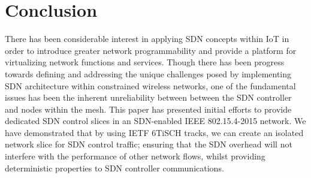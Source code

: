 \section{Conclusion}
\label{sec_conclusion}

There has been considerable interest in applying SDN concepts within IoT in order to introduce greater network programmability and provide a platform for virtualizing network functions and services. Though there has been progress towards defining and addressing the unique challenges posed by implementing SDN architecture within constrained wireless networks, one of the fundamental issues has been the inherent unreliability between between the SDN controller and nodes within the mesh. This paper has presented initial efforts to provide dedicated SDN control slices in an SDN-enabled IEEE 802.15.4-2015 network. We have demonstrated that by using IETF 6TiSCH tracks, we can create an isolated network slice for SDN control traffic; ensuring that the SDN overhead will not interfere with the performance of other network flows, whilst providing deterministic properties to SDN controller communications.